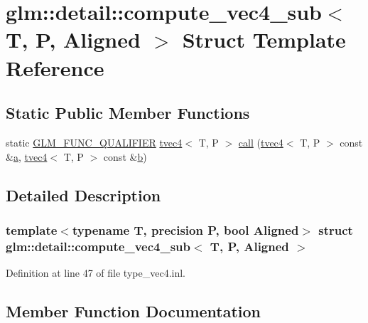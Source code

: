 \hypertarget{structglm_1_1detail_1_1compute__vec4__sub}{}\section{glm\+::detail\+::compute\+\_\+vec4\+\_\+sub$<$ T, P, Aligned $>$ Struct Template Reference}
\label{structglm_1_1detail_1_1compute__vec4__sub}
\subsection*{Static Public Member Functions}
\begin{DoxyCompactItemize}
\item 
static \mbox{\hyperlink{setup_8hpp_a33fdea6f91c5f834105f7415e2a64407}{G\+L\+M\+\_\+\+F\+U\+N\+C\+\_\+\+Q\+U\+A\+L\+I\+F\+I\+ER}} \mbox{\hyperlink{structglm_1_1tvec4}{tvec4}}$<$ T, P $>$ \mbox{\hyperlink{structglm_1_1detail_1_1compute__vec4__sub_af5ce787235b8f9a213ab75d54edefa41}{call}} (\mbox{\hyperlink{structglm_1_1tvec4}{tvec4}}$<$ T, P $>$ const \&\mbox{\hyperlink{glad_8h_ac8729153468b5dcf13f971b21d84d4e5}{a}}, \mbox{\hyperlink{structglm_1_1tvec4}{tvec4}}$<$ T, P $>$ const \&\mbox{\hyperlink{glad_8h_a6eba317e3cf44d6d26c04a5a8f197dcb}{b}})
\end{DoxyCompactItemize}


\subsection{Detailed Description}
\subsubsection*{template$<$typename T, precision P, bool Aligned$>$\newline
struct glm\+::detail\+::compute\+\_\+vec4\+\_\+sub$<$ T, P, Aligned $>$}



Definition at line 47 of file type\+\_\+vec4.\+inl.



\subsection{Member Function Documentation}
\mbox{\label{structglm_1_1detail_1_1compute__vec4__sub_af5ce787235b8f9a213ab75d54edefa41}} 
